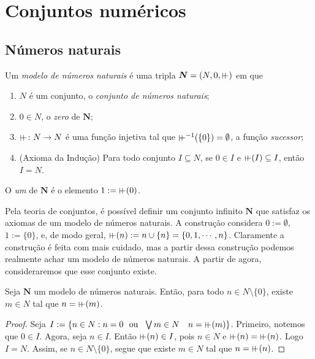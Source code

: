\section{Conjuntos numéricos}


\subsection{Números naturais}

\begin{definition}
	Um \emph{modelo de números naturais} é uma tripla $\bm N = (N,0,\suce)$ em que 
	\begin{enumerate}
	\item $N$ é um conjunto, o \emph{conjunto de números naturais};
	\item $0 \in N$, o \emph{zero} de $\bm N$;
	\item $\suce\colon N \to N$ é uma função injetiva tal que $\suce\inv(\{0\})=\emptyset$, a função \emph{sucessor};
	\item (Axioma da Indução) Para todo conjunto $I \subseteq N$, se $0 \in I$ e $\suce(I) \subseteq I$, então $I=N$.
	\end{enumerate}
O \emph{um} de $\bm N$ é o elemento $1 := \suce(0)$.
\end{definition}

Pela teoria de conjuntos, é possível definir um conjunto infinito $\bm N$ que satisfaz os axiomas de um modelo de números naturais. A construção considera $0 := \emptyset$, $1 := \{0\}$, e, de modo geral, $\suce(n) := n \cup \{n\} = \{0,1,\cdots,n\}$. Claramente a construção é feita com mais cuidado, mas a partir dessa construção podemos realmente achar um modelo de números naturais. A partir de agora, consideraremos que esse conjunto existe.

\begin{proposition}
	Seja $\bm N$ um  modelo de números naturais. Então, para todo $n \in N\setminus \{0\}$, existe $m \in N$ tal que $n=\suce(m)$.
\end{proposition}
\begin{proof}
	Seja $I := \{n \in N:n=0 \text{\ \ ou\ \ } \exists m \in N \quad n=\suce(m)\}$. Primeiro, notemos que $0 \in I$. Agora, seja $n \in I$. Então $\suce(n) \in I$, pois $n \in N$ e $\suce(n)=\suce(n)$. Logo $I=N$. Assim, se $n \in N \setminus \{0\}$, segue que existe $m \in N$ tal que $n=\suce(n)$.
\end{proof}

